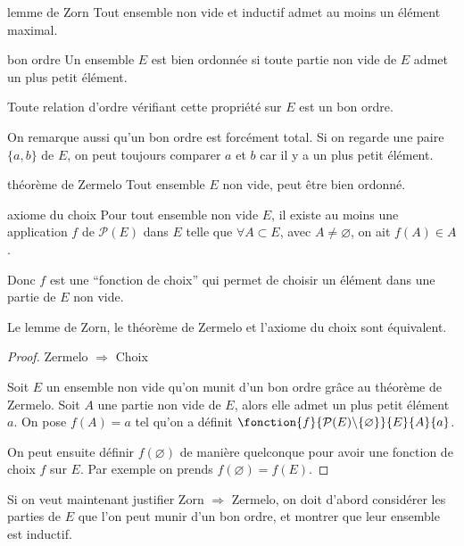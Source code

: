 \begin{theorem}{lemme de Zorn}{}
    Tout ensemble non vide et inductif admet au moins un élément maximal.
\end{theorem}

\begin{definition}{bon ordre}{}
    Un ensemble $E$ est bien ordonnée si toute partie non vide de $E$ admet un plus petit élément. 
    
    Toute relation d'ordre vérifiant cette propriété sur $E$ est un bon ordre.
\end{definition}

On remarque aussi qu'un bon ordre est forcément total. 
Si on regarde une paire $\{a,b\}$ de $E$, on peut toujours comparer $a$ et $b$ car il y a un plus petit élément.

\begin{theorem}{théorème de Zermelo}{}
    Tout ensemble $E$ non vide, peut être bien ordonné.
\end{theorem}

\begin{theorem}{axiome du choix}{}
    Pour tout ensemble non vide $E$, il existe au moins une application $f$ de $\mathcal{P}(E)$ dans $E$ 
    telle que $\forall A \subset E$, avec $A \neq \varnothing$, on ait $f(A) \in A$.
\end{theorem}

Donc $f$ est une ``fonction de choix'' qui permet de choisir un élément dans une partie de $E$ non vide.

\begin{proposition}{}{}
    Le lemme de Zorn, le théorème de Zermelo et l'axiome du choix sont équivalent.
\end{proposition}

\begin{proof}
    Zermelo $\Longrightarrow$ Choix

    Soit $E$ un ensemble non vide qu'on munit d'un bon ordre grâce au théorème de Zermelo.
    Soit $A$ une partie non vide de $E$, alors elle admet un plus petit élément $a$.
    On pose $f(A) = a$ tel qu'on a définit $\fonction{f}{ \mathcal{P}(E)\backslash \{ \varnothing \} }{E}{A}{a}$.

    On peut ensuite définir $f(\varnothing)$ de manière quelconque pour avoir une fonction de choix $f$ sur $E$.
    Par exemple on prends $f(\varnothing) = f(E)$.

\end{proof}

Si on veut maintenant justifier Zorn $\Longrightarrow$ Zermelo, on doit d'abord considérer les parties de $E$ que l'on peut munir d'un bon ordre, et montrer que leur ensemble est inductif.

